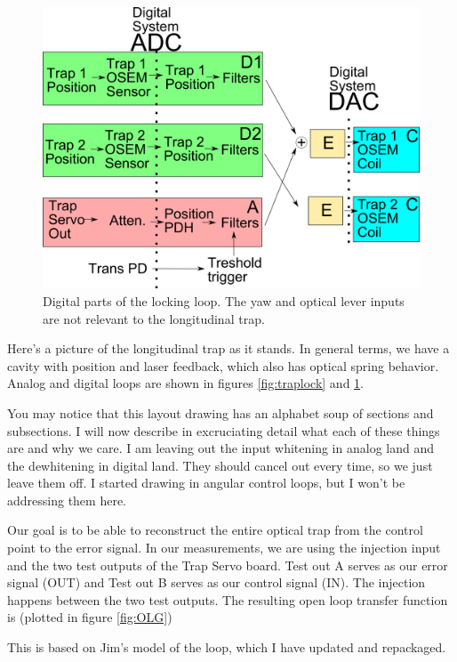 \begin{figure}[htp]
\includegraphics[width=\columnwidth]{figures/controls/traplockdig.png}%
\caption[Digital loops]{Digital parts of the locking loop.  The yaw and optical lever inputs are not relevant to the longitudinal trap.}%
\label{fig:traplockdig}%
\end{figure}


Here's a picture of the longitudinal trap as it stands.  In general terms, we have a cavity with position and laser feedback, which also has optical spring behavior.  Analog and digital loops are shown in figures \ref{fig:traplock} and \ref{fig:traplockdig}.

You may notice that this layout drawing has an alphabet soup of sections and subsections. I will now describe in excruciating detail what each of these things are and why we care.  I am leaving out the input whitening in analog land and the dewhitening in digital land.  They should cancel out every time, so we just leave them off.  I started drawing in angular control loops, but I won't be addressing them here.

Our goal is to be able to reconstruct the entire optical trap from the control point to the error signal.  In our measurements, we are using the injection input and the two test outputs of the Trap Servo board. Test out A serves as our error signal (OUT) and Test out B serves as our control signal (IN).  The injection happens between the two test outputs. The resulting open loop transfer function is (plotted in figure \ref{fig:OLG})

This is based on Jim's model of the loop, which I have updated and repackaged.

